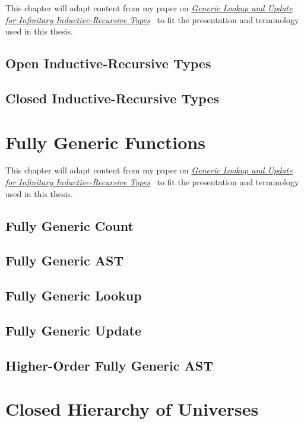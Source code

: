 \documentclass[12pt]{report}
\theoremstyle{definition}
\theoremstyle{remark}
\numberwithin{definition}{section}
\numberwithin{equation}{section}
\numberwithin{proposition}{section}
\numberwithin{conjecture}{section}
\numberwithin{theorem}{section}
\numberwithin{lemma}{section}
\numberwithin{corollary}{section}
\numberwithin{example}{section}
\numberwithin{remark}{section}
\begin{document}
This chapter will adapt content from my paper on
\href{http://dl.acm.org/citation.cfm?id=2976031}
     {\textit{Generic Lookup and Update for Infinitary
         Inductive-Recursive Types}}~\cite{diehl:gupdate}
to fit the presentation and terminology used in this thesis.

\section{Open Inductive-Recursive Types}\label{sec:naiveclosed}
\section{Closed Inductive-Recursive Types}\label{sec:closed}


\chapter{Fully Generic Functions}\label{ch:fullyg}

This chapter will adapt content from my paper on
\href{http://dl.acm.org/citation.cfm?id=2976031}
     {\textit{Generic Lookup and Update for Infinitary
         Inductive-Recursive Types}}~\cite{diehl:gupdate}
to fit the presentation and terminology used in this thesis.

\section{Fully Generic Count}
\section{Fully Generic AST}
\section{Fully Generic Lookup}
\section{Fully Generic Update}
\section{Higher-Order Fully Generic AST}


\chapter{Closed Hierarchy of Universes}\label{ch:hier}
\end{document}
